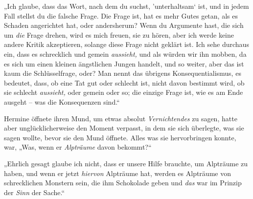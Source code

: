 „Ich glaube, dass das Wort, nach dem du suchst, ’unterhaltsam‘ ist, und in jedem Fall stellst du die falsche Frage. Die Frage ist, hat es mehr Gutes getan, als es Schaden angerichtet hat, oder andersherum? Wenn du Argumente hast, die sich um \emph{die} Frage drehen, wird es mich freuen, sie zu hören, aber ich werde keine andere Kritik akzeptieren, solange diese Frage nicht geklärt ist. Ich sehe durchaus ein, dass es schrecklich und gemein \emph{aussieht,} und als würden wir ihn mobben, da es sich um einen kleinen ängstlichen Jungen handelt, und so weiter, aber das ist kaum die Schlüsselfrage, oder? Man nennt das übrigens Konsequentialismus, es bedeutet, dass, ob eine Tat gut oder schlecht ist, nicht davon bestimmt wird, ob sie schlecht \emph{aussieht,} oder gemein oder so; die einzige Frage ist, wie es am Ende ausgeht – was die Konsequenzen sind.“

Hermine öffnete ihren Mund, um etwas absolut \emph{Vernichtendes} zu sagen, hatte aber unglücklicherweise den Moment verpasst, in dem sie sich überlegte, was sie sagen wollte, bevor sie den Mund öffnete. Alles was sie hervorbringen konnte, war, „Was, wenn er \emph{Alpträume} davon bekommt?“

„Ehrlich gesagt glaube ich nicht, dass er unsere Hilfe brauchte, um Alpträume zu haben, und wenn er jetzt \emph{hiervon} Alpträume hat, werden es Alpträume von schrecklichen Monstern sein, die ihm Schokolade geben und \emph{das} war im Prinzip der \emph{Sinn} der Sache.“

